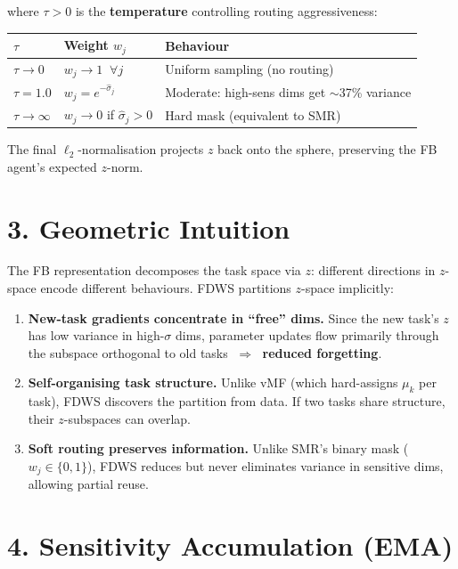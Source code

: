 \documentclass[11pt]{article}
\begin{document}
\noindent where $\tau > 0$ is the \textbf{temperature} controlling routing aggressiveness:

\medskip
\begin{center}
\begin{tabular}{lll}
\toprule
$\tau$ & Weight $w_j$ & Behaviour \\
\midrule
$\tau \to 0$   & $w_j \to 1\;\;\forall j$ & Uniform sampling (no routing) \\
$\tau = 1.0$   & $w_j = e^{-\hat{\sigma}_j}$ & Moderate: high-sens dims get $\sim$37\% variance \\
$\tau \to \infty$ & $w_j \to 0$ if $\hat{\sigma}_j > 0$ & Hard mask (equivalent to SMR) \\
\bottomrule
\end{tabular}
\end{center}

\medskip
\noindent The final $\ell_2$-normalisation projects $z$ back onto the sphere, preserving the FB agent's expected $z$-norm.

\section*{3.\; Geometric Intuition}

The FB representation decomposes the task space via $z$: different directions in $z$-space encode different behaviours. FDWS partitions $z$-space implicitly:

\begin{enumerate}
\item \textbf{New-task gradients concentrate in ``free'' dims.} Since the new task's $z$ has low variance in high-$\sigma$ dims, parameter updates flow primarily through the subspace orthogonal to old tasks $\;\Rightarrow\;$ \textbf{reduced forgetting}.

\item \textbf{Self-organising task structure.} Unlike vMF (which hard-assigns $\mu_k$ per task), FDWS discovers the partition from data. If two tasks share structure, their $z$-subspaces can overlap.

\item \textbf{Soft routing preserves information.} Unlike SMR's binary mask ($w_j \in \{0,1\}$), FDWS reduces but never eliminates variance in sensitive dims, allowing partial reuse.
\end{enumerate}

\section*{4.\; Sensitivity Accumulation (EMA)}
\end{document}
